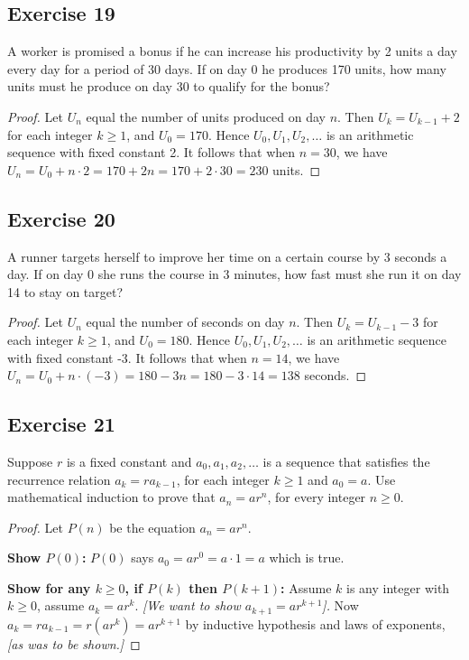 \documentclass[14pt]{extarticle}
\begin{document}
    \subsection{Exercise 19}
    A worker is promised a bonus if he can increase his productivity by 2 units a day every day for a period of 30
    days. If on day 0 he produces 170 units, how many units must he produce on day 30 to qualify for the bonus?

    \begin{proof}
        Let \(U_n\) equal the number of units produced on day $n$. Then \(U_k = U_{k-1} + 2\) for each integer \(k \geq 1\),
        and \(U_0 = 170\). Hence \(U_0, U_1, U_2, \ldots\) is an arithmetic sequence with fixed constant 2. It follows that
        when \(n = 30\), we have \(U_n = U_0 + n \cdot 2 = 170 + 2n = 170 + 2 \cdot 30 = 230\) units.
    \end{proof}

    \subsection{Exercise 20}
    A runner targets herself to improve her time on a certain course by 3 seconds a day. If on day 0 she runs the course
    in 3 minutes, how fast must she run it on day 14 to stay on target?

    \begin{proof}
        Let \(U_n\) equal the number of seconds on day $n$. Then \(U_k = U_{k-1} - 3\) for each integer \(k \geq 1\),
        and \(U_0 = 180\). Hence \(U_0, U_1, U_2, \ldots\) is an arithmetic sequence with fixed constant -3. It follows that
        when \(n = 14\), we have \(U_n = U_0 + n \cdot (-3) = 180 - 3n = 180 - 3 \cdot 14 = 138\) seconds.
    \end{proof}

    \subsection{Exercise 21}
    Suppose $r$ is a fixed constant and \(a_0, a_1, a_2, \ldots\) is a sequence that satisfies the recurrence
    relation \(a_k = r a_{k-1}\), for each integer \(k \geq 1\) and \(a_0 = a\). Use mathematical induction to prove that
    \(a_n = a r^n\), for every integer \(n \geq 0\).

    \begin{proof}
        Let $P(n)$ be the equation \(a_n = a r^n\).

            {\bf Show $P(0)$:} $P(0)$ says \(a_0 = a r^0 = a \cdot 1 = a\) which is true.

            {\bf Show for any \(k \geq 0\), if $P(k)$ then $P(k+1)$:}
        Assume $k$ is any integer with \(k \geq 0\), assume \(a_k = a r^k\). {\it [We want to show \(a_{k+1} = ar^{k+1}\)].}
        Now \(a_k = r a_{k-1} = r(ar^k) = ar^{k+1}\) by inductive hypothesis and laws of exponents, {\it [as was to be shown.]}
    \end{proof}
\end{document}
